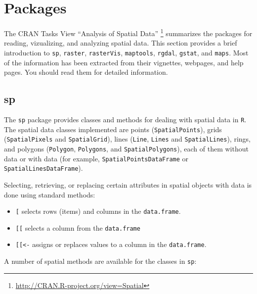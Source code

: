 \documentclass[smallroyalvopaper]{memoir}
\begin{document}
\section{Packages}
\label{sec:org937d336}
\label{sec:spatial-packages}

The CRAN Tasks View ``Analysis of Spatial Data'' \footnote{\url{http://CRAN.R-project.org/view=Spatial}} summarizes the packages for reading, vizualizing, and analyzing spatial data. This section provides a brief introduction to \texttt{sp}, \texttt{raster}, \texttt{rasterVis}, \texttt{maptools}, \texttt{rgdal}, \texttt{gstat}, and \texttt{maps}. Most of the information has been extracted from their vignettes, webpages, and help pages. You should read them for detailed information.

\subsection{sp}
\label{sec:org12d63f9}
\label{sec:sp}


The \texttt{sp} package \cite{Pebesma.Bivand2005} provides classes and methods for dealing with spatial data in \texttt{R}. The spatial data classes implemented are points (\texttt{SpatialPoints}), grids (\texttt{SpatialPixels} and \texttt{SpatialGrid}), lines (\texttt{Line}, \texttt{Lines} and \texttt{SpatialLines}), rings, and polygons (\texttt{Polygon}, \texttt{Polygons}, and \texttt{SpatialPolygons}), each of them without data or with data (for example, \texttt{SpatialPointsDataFrame} or \texttt{SpatialLinesDataFrame}).

Selecting, retrieving, or replacing certain attributes in spatial objects with data is done using standard methods:

\begin{itemize}
\item \texttt{[} selects rows (items) and columns in the \texttt{data.frame}.

\item \texttt{[[} selects a column from the \texttt{data.frame}

\item \texttt{[[<-} assigns or replaces values to a column in the \texttt{data.frame}.
\end{itemize}

A number of spatial methods are available for the classes in \texttt{sp}:
\end{document}
